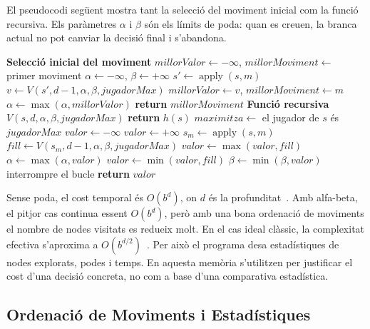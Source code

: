 \documentclass[conference,compsoc]{IEEEtran}
\begin{document}
El pseudocodi següent mostra tant la selecció del moviment inicial com la funció
recursiva. Els paràmetres $\alpha$ i $\beta$ són els límits de poda: quan es
creuen, la branca actual no pot canviar la decisió final i s'abandona.

\begin{algorithm}[H]
\caption{Minimax amb poda alfa-beta}
\begin{algorithmic}[1]
\STATE \textbf{Selecció inicial del moviment}
\STATE $millorValor \leftarrow -\infty$, $millorMoviment \leftarrow$ primer moviment
\STATE $\alpha \leftarrow -\infty$, $\beta \leftarrow +\infty$
    \STATE $s' \leftarrow \operatorname{apply}(s,m)$
    \STATE $v \leftarrow V(s', d-1, \alpha, \beta, jugadorMax)$
        \STATE $millorValor \leftarrow v$, $millorMoviment \leftarrow m$
    \ENDIF
    \STATE $\alpha \leftarrow \max(\alpha, millorValor)$
\ENDFOR
\STATE \textbf{return} $millorMoviment$
\STATE
\STATE \textbf{Funció recursiva} $V(s,d,\alpha,\beta,jugadorMax)$
    \STATE \textbf{return} $h(s)$
\ENDIF
\STATE $maximitza \leftarrow$ el jugador de $s$ és $jugadorMax$
    \STATE $valor \leftarrow -\infty$
\ELSE
    \STATE $valor \leftarrow +\infty$
\ENDIF
{}
    \STATE $s_m \leftarrow \operatorname{apply}(s,m)$
    \STATE $fill \leftarrow V(s_m,d-1,\alpha,\beta,jugadorMax)$
        \STATE $valor \leftarrow \max(valor, fill)$
        \STATE $\alpha \leftarrow \max(\alpha, valor)$
    \ELSE
        \STATE $valor \leftarrow \min(valor, fill)$
        \STATE $\beta \leftarrow \min(\beta, valor)$
    \ENDIF
    \IF{$\alpha \geq \beta$}
        \STATE interrompre el bucle
    \ENDIF
\ENDFOR
\STATE \textbf{return} $valor$
\end{algorithmic}
\end{algorithm}

Sense poda, el cost temporal és $O(b^d)$, on $d$ és la profunditat~\cite{ref_gfg_minimax}. Amb alfa-beta,
el pitjor cas continua essent $O(b^d)$, però amb una bona ordenació de moviments el
nombre de nodes visitats es redueix molt. En el cas ideal clàssic, la complexitat
efectiva s'aproxima a $O(b^{d/2})$~\cite{ref_gfg_alphabeta}. Per això el programa desa
estadístiques de nodes explorats, podes i temps. En aquesta memòria s'utilitzen
per justificar el cost d'una decisió concreta, no com a base d'una comparativa
estadística.

\subsection{Ordenació de Moviments i Estadístiques}
\end{document}

